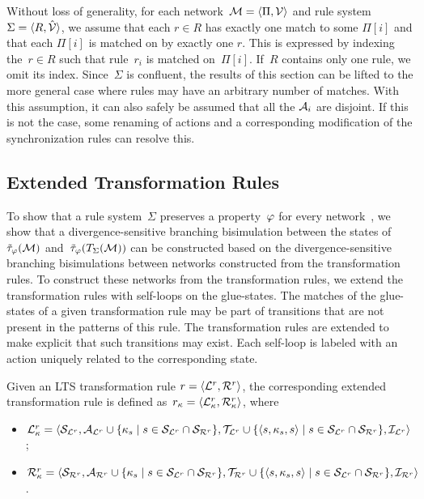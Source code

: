 Without loss of generality, for each network~$\mathcal{M} = \langle \Pi, {\mathcal{V}} \rangle$ and rule system~$\Sigma = \langle R,\hat{{\mathcal{V}}} \rangle$, we assume that each $r \in R$ has exactly one match to some $\Pi[i]$ and that each $\Pi[i]$ is matched on by exactly one $r$.
This is expressed by indexing the~$r \in R$ such that rule~$r_i$ is matched on~$\Pi[i]$.
If~$R$ contains only one rule, we omit its index.
Since~$\Sigma$ is confluent, the results of this section can be lifted to the more general case where rules may have an arbitrary number of matches.
With this assumption, it can also safely be assumed that all the ${\mathcal{A}_{i}}$ are disjoint.
If this is not the case, some renaming of actions and a corresponding modification of the synchronization rules can resolve this.

\subsection{Extended Transformation Rules}
To show that a rule system~$\Sigma$ preserves a property~$\varphi$ for every network~\smodel, we show that a divergence-sensitive branching bisimulation between the states of~$\tilde\tau_\varphi(\mathcal{M})$ and~$\tilde\tau_\varphi(T_{\Sigma} (\mathcal{M}))$ can be constructed based on the divergence-sensitive branching bisimulations between networks constructed from the transformation rules.
To construct these networks from the transformation rules, we extend the transformation rules with self-loops on the glue-states.
The matches of the glue-states of a given transformation rule may be part of transitions that are not present in the patterns of this rule.
The transformation rules are extended to make explicit that such transitions may exist.
Each self-loop is labeled with an action uniquely related to the corresponding state.

\begin{definition}
\label{def:lts-transformation:extendedtransformationrule}
Given an LTS transformation rule $r = \langle \mathcal{L}^{r}, \mathcal{R}^{r} \rangle$, the corresponding extended transformation rule is defined as~$r_\kappa = \langle \mathcal{L}^r_\kappa, \mathcal{R}^r_\kappa \rangle$, where
\begin{itemize}
\item
$\mathcal{L}^r_\kappa = \langle {\mathcal{S}_{\ensuremath{\mathcal{L}}^r}}, {\mathcal{A}_{\mathcal{L}^r}} \cup \{ \kappa_s \mid s \in {\mathcal{S}_{\ensuremath{\mathcal{L}}^r}} \cap {\mathcal{S}_{\ensuremath{\mathcal{R}}^r}} \}, {\mathcal{T}_{\mathcal{L}^r}} \cup \{ \langle s, \kappa_s, s \rangle \mid s \in {\mathcal{S}_{\ensuremath{\mathcal{L}}^r}} \cap {\mathcal{S}_{\ensuremath{\mathcal{R}}^r}} \}, \mathcal{I}_{\mathcal{L}^r} \rangle$;
\item
$\mathcal{R}^r_\kappa = \langle {\mathcal{S}_{\ensuremath{\mathcal{R}}^r}}, {\mathcal{A}_{\mathcal{R}^r}} \cup \{ \kappa_s \mid s \in {\mathcal{S}_{\ensuremath{\mathcal{L}}^r}} \cap {\mathcal{S}_{\ensuremath{\mathcal{R}}^r}} \}, {\mathcal{T}_{\mathcal{R}^r}} \cup \{ \langle s, \kappa_s, s \rangle \mid s \in {\mathcal{S}_{\ensuremath{\mathcal{L}}^r}} \cap {\mathcal{S}_{\ensuremath{\mathcal{R}}^r}} \}, \mathcal{I}_{\mathcal{R}^r} \rangle$.
\end{itemize}
\end{definition}

